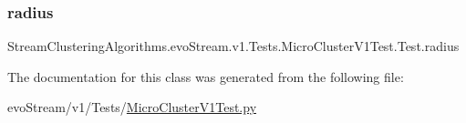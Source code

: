 \subsubsection{\texorpdfstring{radius}{radius}}
{\footnotesize\ttfamily Stream\+Clustering\+Algorithms.\+evo\+Stream.\+v1.\+Tests.\+Micro\+Cluster\+V1\+Test.\+Test.\+radius}



The documentation for this class was generated from the following file\+:\begin{DoxyCompactItemize}
\item 
evo\+Stream/v1/\+Tests/\hyperlink{MicroClusterV1Test_8py}{Micro\+Cluster\+V1\+Test.\+py}\end{DoxyCompactItemize}
